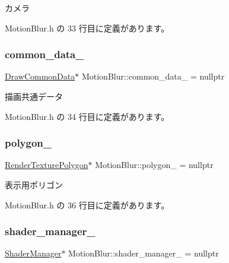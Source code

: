 カメラ 



 Motion\+Blur.\+h の 33 行目に定義があります。

\mbox{\label{class_motion_blur_aecc7c243d6ec641ec5d0bdc7bbeff481}} 
\subsubsection{\texorpdfstring{common\+\_\+data\+\_\+}{common\_data\_}}
{\footnotesize\ttfamily \mbox{\hyperlink{class_draw_common_data}{Draw\+Common\+Data}}$\ast$ Motion\+Blur\+::common\+\_\+data\+\_\+ = nullptr\hspace{0.3cm}{\ttfamily [private]}}



描画共通データ 



 Motion\+Blur.\+h の 34 行目に定義があります。

\mbox{\label{class_motion_blur_a14af04a5a96dbdeed47b07bd7bd3d860}} 
\subsubsection{\texorpdfstring{polygon\+\_\+}{polygon\_}}
{\footnotesize\ttfamily \mbox{\hyperlink{class_render_texture_polygon}{Render\+Texture\+Polygon}}$\ast$ Motion\+Blur\+::polygon\+\_\+ = nullptr\hspace{0.3cm}{\ttfamily [private]}}



表示用ポリゴン 



 Motion\+Blur.\+h の 36 行目に定義があります。

\mbox{\label{class_motion_blur_a888c174da110fd14c2fcf2ab5c751dda}} 
\subsubsection{\texorpdfstring{shader\+\_\+manager\+\_\+}{shader\_manager\_}}
{\footnotesize\ttfamily \mbox{\hyperlink{class_shader_manager}{Shader\+Manager}}$\ast$ Motion\+Blur\+::shader\+\_\+manager\+\_\+ = nullptr\hspace{0.3cm}{\ttfamily [private]}}



